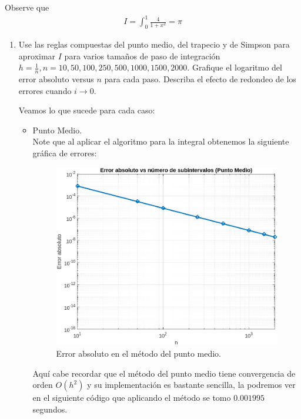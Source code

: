 \begin{homeworkProblem}
  Observe que
  \begin{align*}
    I=\int_{0}^{1}\frac{4}{1+x^2}=\pi 
  \end{align*}
  \begin{enumerate}
    \item Use las reglas compuestas del punto medio, del trapecio y de Simpson para aproximar $I$ para varios tamaños de paso de integración $h= \frac{1}{n}, n = 10,50, 100, 250, 500, 1000, 1500, 2000$. Grafique el logaritmo del error absoluto versus $n$ para cada paso. Describa el efecto de redondeo de los errores cuando $i\to 0$.
      \begin{solucion}
        Veamos lo que sucede para cada caso:
        \begin{itemize}
          \item Punto Medio.\\
            Note que al aplicar el algoritmo para la integral obtenemos la siguiente gráfica de errores:
            \begin{figure}[H]
            \begin{center}
              \includegraphics[scale=0.7]{Figures/puntomedio.png}
            \end{center}
            \caption{Error absoluto en el método del punto medio.}
            \end{figure}
            Aquí cabe recordar que el método del punto medio tiene convergencia de orden $O(h^2)$ y su implementación es bastante sencilla, la podremos ver en el siguiente código que aplicando el método se tomo $0.001995$ segundos.

\end{itemize}
\end{solucion}
\end{enumerate}
\end{homeworkProblem}

